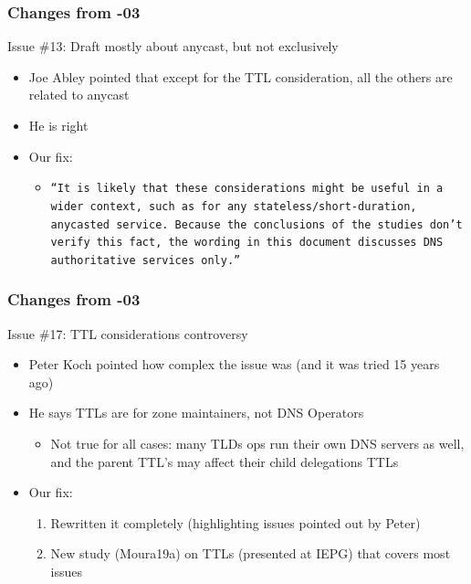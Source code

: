 \documentclass[11pt,show 
notes,notheorems,noamsthm,blank]{beamer} %
\begin{document}
\begin{frame}
\frametitle{Changes from -03}
\begin{block}{ Issue \#13: Draft mostly about anycast, but not exclusively}
\begin{itemize}
 \item Joe Abley pointed that except for the TTL consideration, all the others are related to anycast
 \item He is right
 \item Our fix:
 \begin{itemize}
 
 \item
 
      \texttt{``It is likely that these considerations might be useful in a wider context,
         such as for any stateless/short-duration, anycasted service. 
         Because the conclusions of the studies don't verify this fact, 
         the wording in this document discusses DNS authoritative services only.''}

 \end{itemize}
\end{itemize} 

 
\end{block}



\end{frame}



\begin{frame}
\frametitle{Changes from -03}
\begin{block}{ Issue \#17: TTL considerations controversy }
\begin{itemize}
\item Peter Koch pointed how complex the issue was (and it was tried 15 years ago)
\item He says TTLs are for zone maintainers, not DNS Operators 
\begin{itemize}
 \item Not true for all cases: many TLDs ops run their own DNS servers
   as well, and the parent TTL's may affect their child delegations TTLs
 
\end{itemize}
\item Our fix:
\begin{enumerate}
 \item Rewritten  it completely (highlighting issues pointed out by Peter)
 \item New study (Moura19a) on TTLs (presented at IEPG) that covers most issues
\end{enumerate}

\end{itemize} 

 
\end{block}
\end{frame}
\end{document}

